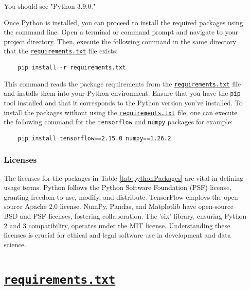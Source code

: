 You should see "Python 3.9.0." 

Once Python is installed, you can proceed to install the required packages using the command line. Open a terminal or command prompt and navigate to your project directory. Then, execute the following command in the same directory that the \href{run:../Code/KeywordSpotting/envRequirements/requirements.txt}{\texttt{requirements.txt}} file exists:

\begin{verbatim}
	pip install -r requirements.txt
\end{verbatim}

This command reads the package requirements from the \href{run:../Code/KeywordSpotting/envRequirements/requirements.txt}{\texttt{requirements.txt}} file and installs them into your Python environment. Ensure that you have the \texttt{pip} tool installed and that it corresponds to the Python version you've installed. To install the packages without using the \href{run:../Code/KeywordSpotting/envRequirements/requirements.txt}{\texttt{requirements.txt}} file, one can execute the following command for the \texttt{tensorflow} and \texttt{numpy} packages for example:

\begin{verbatim}
	pip install tensorflow==2.15.0 numpy==1.26.2
\end{verbatim}

\subsubsection{Licenses}

The licenses for the packages in Table \ref{tab:pythonPackages} are vital in defining usage terms. Python follows the Python Software Foundation (PSF) license, granting freedom to use, modify, and distribute. TensorFlow employs the open-source Apache 2.0 license. NumPy, Pandas, and Matplotlib have open-source BSD and PSF licenses, fostering collaboration. The 'six' library, ensuring Python 2 and 3 compatibility, operates under the MIT license. Understanding these licenses is crucial for ethical and legal software use in development and data science.

\section{\href{run:../Code/KeywordSpotting/envRequirements/requirements.txt}{\texttt{requirements.txt}}}
\label{section:requirementsFile}

